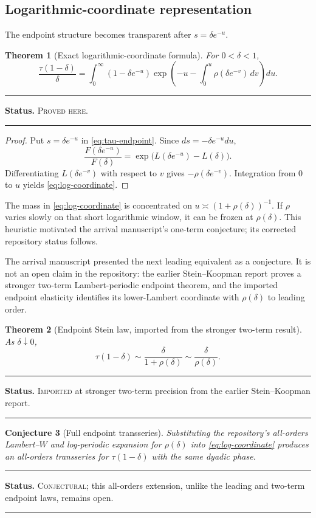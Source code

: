\documentclass[11pt,oneside]{article}
\newtheorem{theorem}{Theorem}[section]
\newtheorem{conjecture}[theorem]{Conjecture}
\theoremstyle{definition}
\theoremstyle{remark}
\newenvironment{boxedremark}{%
  \par\smallskip\noindent\begin{center}\begin{minipage}{0.94\textwidth}%
  \color{black}\hrule\vspace{0.6em}\small
}{%
  \vspace{0.6em}\hrule\end{minipage}\end{center}\smallskip
}
\newcommand{\Imported}{\textsc{Imported}}
\newcommand{\ProvedHere}{\textsc{Proved here}}
\newcommand{\Conjectural}{\textsc{Conjectural}}
\newcommand{\Status}[1]{%
  \begin{boxedremark}\textbf{Status.} #1.\end{boxedremark}}
\begin{document}
\subsection{Logarithmic-coordinate representation}
The endpoint structure becomes transparent after $s=\delta e^{-u}$.

\begin{theorem}[Exact logarithmic-coordinate formula]\label{thm:log-coordinate}
For $0<\delta<1$,
\begin{equation}\label{eq:log-coordinate}
 \frac{\tau(1-\delta)}{\delta}
 =\int_0^\infty
 (1-\delta e^{-u})
 \exp\!\left(
   -u-\int_0^u\rho(\delta e^{-v})\,dv
 \right)du.
\end{equation}
\end{theorem}
\Status{\ProvedHere}

\begin{proof}
Put $s=\delta e^{-u}$ in \eqref{eq:tau-endpoint}.  Since
$ds=-\delta e^{-u}du$,
\[
 \frac{F(\delta e^{-u})}{F(\delta)}
 =\exp\bigl(L(\delta e^{-u})-L(\delta)\bigr).
\]
Differentiating $L(\delta e^{-v})$ with respect to $v$ gives
$-\rho(\delta e^{-v})$.  Integration from $0$ to $u$ yields
\eqref{eq:log-coordinate}.
\end{proof}

The mass in \eqref{eq:log-coordinate} is concentrated on
$u\asymp(1+\rho(\delta))^{-1}$.  If $\rho$ varies slowly on that short logarithmic
window, it can be frozen at $\rho(\delta)$.  This heuristic motivated the
arrival manuscript's one-term conjecture; its corrected repository status follows.

The arrival manuscript presented the next leading equivalent as a conjecture.
It is not an open claim in the repository: the earlier Stein--Koopman report
proves a stronger two-term Lambert-periodic endpoint theorem, and the imported
endpoint elasticity identifies its lower-Lambert coordinate with
$\rho(\delta)$ to leading order.

\begin{theorem}[Endpoint Stein law, imported from the stronger two-term result]
\label{thm:stein-endpoint}
As $\delta\downarrow0$,
\begin{equation}\label{eq:stein-endpoint}
 \tau(1-\delta)
 \sim\frac{\delta}{1+\rho(\delta)}
 \sim\frac{\delta}{\rho(\delta)}.
\end{equation}
\end{theorem}
\Status{\Imported{} at stronger two-term precision from the earlier
Stein--Koopman report}

\begin{conjecture}[Full endpoint transseries]
Substituting the repository's all-orders Lambert--$W$ and log-periodic expansion
for $\rho(\delta)$ into \eqref{eq:log-coordinate} produces an all-orders
transseries for $\tau(1-\delta)$ with the same dyadic phase.
\end{conjecture}
\Status{\Conjectural; this all-orders extension, unlike the leading and
two-term endpoint laws, remains open}
\end{document}
